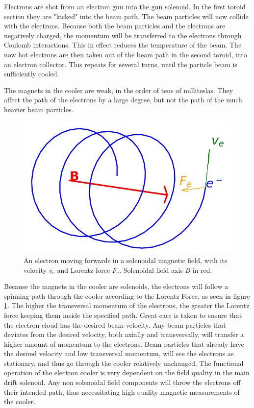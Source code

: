 Electrons are shot from an electron gun into the gun solenoid. In the
first toroid section they are "kicked" into the beam path. The beam particles
will now collide with the electrons. Because both the beam particles and
the electrons are negatively charged, the momentum will be
transferred to the electrons through Coulomb interactions. This in effect
reduces the temperature of the beam. The now hot electrons are
then taken out of the beam path in the second toroid, into an electron collector.
This repeats for several turns, until the particle beam is sufficiently cooled.

The magnets in the cooler are weak, in the order of tens of milliteslas.
They affect the path of the electrons by a large degree, but
not the path of the much heavier beam particles.

\begin{figure}[!h]
    \centering
    \centering
    \includegraphics[width=0.6\linewidth]{figs/epath}
    \caption{An electron moving forwards in a solenoidal magnetic field,
        with its velocity $v_e$ and Lorentz force $F_e$. Solenoidal field axis $B$ in red.}
    \label{fig:epath}
\end{figure}

Because the magnets in the cooler are solenoids, the electrons will follow a
spinning path through the cooler according to the Lorentz Force, as seen in
figure \ref{fig:epath}. The higher the transversal momentum of the electrons,
the greater the Lorentz force keeping them inside the specified path.
Great care is taken to ensure that the electron cloud has the desired
beam velocity. Any beam particles that deviates from the desired
velocity, both axially and transversally, will transfer a higher amount
of momentum to the electrons. Beam particles that already have the desired
velocity and low transversal momentum, will see the electrons as stationary,
and thus go through the cooler relatively unchanged. \cite{d_functional_2023}
The functional operation
of the electron cooler is very dependent on the field quality in the
main drift solenoid. Any non solenoidal field components will throw
the electrons off their intended path, thus necessitating high quality
magnetic measurements of the cooler.
